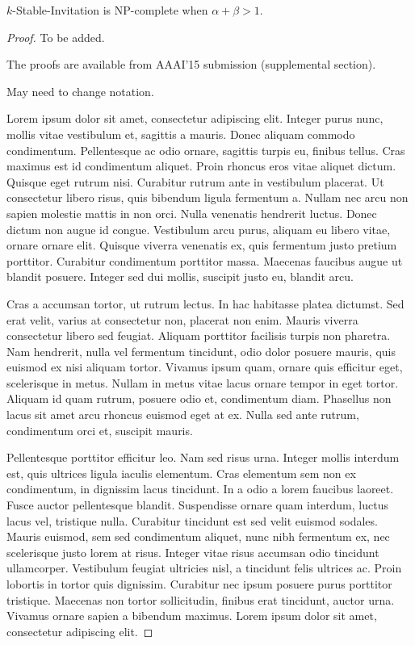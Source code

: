 \begin{theorem} \label{SIP:thm:stable_invitation_NPC}
	$k$-Stable-Invitation is NP-complete when $\alpha + \beta > 1$.
\end{theorem} 
\begin{proof} %
	To be added.
	
	The proofs are available from AAAI'15 submission (supplemental section).
	
	May need to change notation.

Lorem ipsum dolor sit amet, consectetur adipiscing elit. Integer purus nunc, mollis vitae vestibulum et, sagittis a mauris. Donec aliquam commodo condimentum. Pellentesque ac odio ornare, sagittis turpis eu, finibus tellus. Cras maximus est id condimentum aliquet. Proin rhoncus eros vitae aliquet dictum. Quisque eget rutrum nisi. Curabitur rutrum ante in vestibulum placerat. Ut consectetur libero risus, quis bibendum ligula fermentum a. Nullam nec arcu non sapien molestie mattis in non orci. Nulla venenatis hendrerit luctus. Donec dictum non augue id congue. Vestibulum arcu purus, aliquam eu libero vitae, ornare ornare elit. Quisque viverra venenatis ex, quis fermentum justo pretium porttitor. Curabitur condimentum porttitor massa. Maecenas faucibus augue ut blandit posuere. Integer sed dui mollis, suscipit justo eu, blandit arcu.

Cras a accumsan tortor, ut rutrum lectus. In hac habitasse platea dictumst. Sed erat velit, varius at consectetur non, placerat non enim. Mauris viverra consectetur libero sed feugiat. Aliquam porttitor facilisis turpis non pharetra. Nam hendrerit, nulla vel fermentum tincidunt, odio dolor posuere mauris, quis euismod ex nisi aliquam tortor. Vivamus ipsum quam, ornare quis efficitur eget, scelerisque in metus. Nullam in metus vitae lacus ornare tempor in eget tortor. Aliquam id quam rutrum, posuere odio et, condimentum diam. Phasellus non lacus sit amet arcu rhoncus euismod eget at ex. Nulla sed ante rutrum, condimentum orci et, suscipit mauris.

Pellentesque porttitor efficitur leo. Nam sed risus urna. Integer mollis interdum est, quis ultrices ligula iaculis elementum. Cras elementum sem non ex condimentum, in dignissim lacus tincidunt. In a odio a lorem faucibus laoreet. Fusce auctor pellentesque blandit. Suspendisse ornare quam interdum, luctus lacus vel, tristique nulla. Curabitur tincidunt est sed velit euismod sodales. Mauris euismod, sem sed condimentum aliquet, nunc nibh fermentum ex, nec scelerisque justo lorem at risus. Integer vitae risus accumsan odio tincidunt ullamcorper. Vestibulum feugiat ultricies nisl, a tincidunt felis ultrices ac. Proin lobortis in tortor quis dignissim. Curabitur nec ipsum posuere purus porttitor tristique. Maecenas non tortor sollicitudin, finibus erat tincidunt, auctor urna. Vivamus ornare sapien a bibendum maximus. Lorem ipsum dolor sit amet, consectetur adipiscing elit.


\end{proof}
